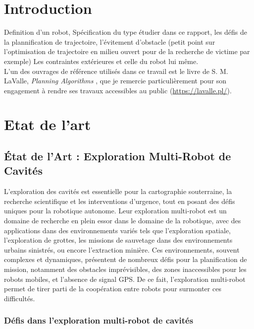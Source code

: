 \documentclass[main.tex]{subfiles}
\begin{document}
\section{Introduction}

Definition d'un robot,
Spécification du type étudier dans ce rapport,
les défis de la plannification de trajectoire,
l'évitement d'obstacle (petit point sur l'optimisation de trajectoire en milieu ouvert pour de la recherche de victime par exemple)
Les contraintes extérieures et celle du robot lui même.\\

L'un des ouvrages de référence utilisés dans ce travail est le livre de S. M. LaValle, \textit{Planning Algorithms} \cite{Lavalle_2006}, que je remercie particulièrement pour son engagement à rendre ses travaux accessibles au public ({\scriptsize \url{https://lavalle.pl/}}).


\newpage

\section{Etat de l'art}

\subsection{État de l'Art : Exploration Multi-Robot de Cavités}

L'exploration des cavités est essentielle pour la cartographie souterraine, la recherche scientifique et les interventions d'urgence, tout en posant des défis uniques pour la robotique autonome.\cite{nationalgeographic_greenland_caves_2025}
Leur exploration multi-robot est un domaine de recherche en plein essor dans le domaine de la robotique, avec des applications dans des environnements variés tels que l'exploration spatiale, l'exploration de grottes, les missions de sauvetage dans des environnements urbains sinistrés, ou encore l'extraction minière.\cite{dang_2021,kambesis_2007} Ces environnements, souvent complexes et dynamiques, présentent de nombreux défis pour la planification de mission, notamment des obstacles imprévisibles, des zones inaccessibles pour les robots mobiles, et l'absence de signal GPS. De ce fait, l'exploration multi-robot permet de tirer parti de la coopération entre robots pour surmonter ces difficultés.

\subsubsection{Défis dans l'exploration multi-robot de cavités}
\end{document}

